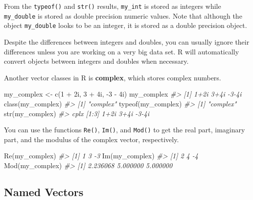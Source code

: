 \documentclass[
]{book}
\newenvironment{Shaded}{\begin{snugshade}}{\end{snugshade}}
\newcommand{\CommentTok}[1]{\textcolor[rgb]{0.56,0.35,0.01}{\textit{#1}}}
\newcommand{\DecValTok}[1]{\textcolor[rgb]{0.00,0.00,0.81}{#1}}
\newcommand{\FunctionTok}[1]{\textcolor[rgb]{0.00,0.00,0.00}{#1}}
\newcommand{\NormalTok}[1]{#1}
\newcommand{\OtherTok}[1]{\textcolor[rgb]{0.56,0.35,0.01}{#1}}
\newcommand{\SpecialCharTok}[1]{\textcolor[rgb]{0.00,0.00,0.00}{#1}}
\newenvironment{blackbox}{
  \definecolor{shadecolor}{rgb}{0, 0, 0}  %
  \color{white}
  \begin{shaded}}
 {\end{shaded}}
\newenvironment{infobox}[1]
  {
  \begin{itemize}
  \renewcommand{\labelitemi}{
    \raisebox{-.7\height}[0pt][0pt]{
      {\setkeys{Gin}{width=3em,keepaspectratio}
        \texttt{[image: pics/\#1]}}
    }
  }
  \setlength{\fboxsep}{1em}
  \begin{blackbox}
  \item
  }
  {
  \end{blackbox}
  \end{itemize}
  }
\begin{document}
From the \texttt{typeof()} and \texttt{str()} results, \texttt{my\_int} is stored as integers while \texttt{my\_double} is stored as double precision numeric values. Note that although the object \texttt{my\_double} looks to be an integer, it is stored as a double precision object.

\begin{infobox}{caution}
Despite the differences between integers and doubles, you can usually ignore their differences unless you are working on a very big data set. R will automatically convert objects between integers and doubles when necessary.

\end{infobox}

Another vector classes in R is \textbf{complex}, which stores complex numbers.

\begin{Shaded}
\begin{Highlighting}[]
\NormalTok{my\_complex }\OtherTok{\textless{}{-}} \FunctionTok{c}\NormalTok{(}\DecValTok{1} \SpecialCharTok{+}\NormalTok{ 2i, }\DecValTok{3} \SpecialCharTok{+}\NormalTok{ 4i, }\SpecialCharTok{{-}}\DecValTok{3} \SpecialCharTok{{-}}\NormalTok{ 4i)}
\NormalTok{my\_complex}
\CommentTok{\#\textgreater{} [1]  1+2i  3+4i {-}3{-}4i}
\FunctionTok{class}\NormalTok{(my\_complex)}
\CommentTok{\#\textgreater{} [1] "complex"}
\FunctionTok{typeof}\NormalTok{(my\_complex)}
\CommentTok{\#\textgreater{} [1] "complex"}
\FunctionTok{str}\NormalTok{(my\_complex)}
\CommentTok{\#\textgreater{}  cplx [1:3] 1+2i 3+4i {-}3{-}4i}
\end{Highlighting}
\end{Shaded}

You can use the functions \texttt{Re()}, \texttt{Im()}, and \texttt{Mod()} to get the real part, imaginary part, and the modulus of the complex vector, respectively.

\begin{Shaded}
\begin{Highlighting}[]
\FunctionTok{Re}\NormalTok{(my\_complex)}
\CommentTok{\#\textgreater{} [1]  1  3 {-}3}
\FunctionTok{Im}\NormalTok{(my\_complex)}
\CommentTok{\#\textgreater{} [1]  2  4 {-}4}
\FunctionTok{Mod}\NormalTok{(my\_complex)}
\CommentTok{\#\textgreater{} [1] 2.236068 5.000000 5.000000}
\end{Highlighting}
\end{Shaded}

\hypertarget{named-vectors}{%
\subsection{Named Vectors}\label{named-vectors}}
\end{document}
